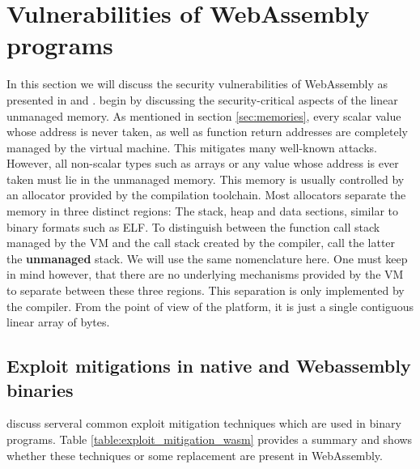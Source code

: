 \documentclass[sigconf]{acmart}
\begin{document}
\section{Vulnerabilities of WebAssembly programs}
\label{sec:binary_vulns}
In this section we will discuss the security vulnerabilities of WebAssembly as presented in \cite{mcfadden_security_2018} and \cite{lehmann_everything_2020}. \cite{lehmann_everything_2020} begin by discussing the security-critical aspects of the linear unmanaged memory. As mentioned in section \ref{sec:memories}, every scalar value whose address is never taken, as well as function return addresses are completely managed by the virtual machine. This mitigates many well-known attacks. However, all non-scalar types such as arrays or any value whose address is ever taken must lie in the unmanaged memory. This memory is usually controlled by an allocator provided by the compilation toolchain. Most allocators separate the memory in three distinct regions: The stack, heap and data sections, similar to binary formats such as ELF. To distinguish between the function call stack managed by the VM and the call stack created by the compiler, \cite{lehmann_everything_2020} call the latter the \textbf{unmanaged} stack. We will use the same nomenclature here. One must keep in mind however, that there are no underlying mechanisms provided by the VM to separate between these three regions. This separation is only implemented by the compiler. From the point of view of the platform, it is just a single contiguous linear array of bytes. 

\subsection{Exploit mitigations in native and Webassembly binaries}
\cite{mcfadden_security_2018} discuss serveral common exploit mitigation techniques which are used in binary programs. Table \ref{table:exploit_mitigation_wasm} provides a summary and shows whether these techniques or some replacement are present in WebAssembly. 
\end{document}
